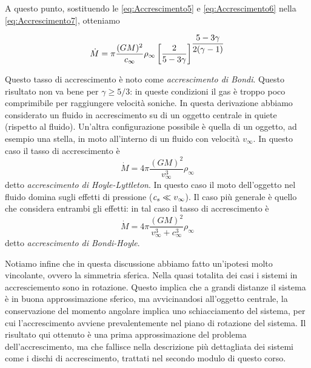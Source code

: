 A questo punto, sostituendo le \ref{eq:Accrescimento5} e \ref{eq:Accrescimento6} nella \ref{eq:Accrescimento7}, otteniamo
\begin{EQ}
\begin{equation}
\dot{M} = \pi \dfrac{(GM)^2}{c_\infty} \rho_\infty\left[ \dfrac{2}{5-3\gamma} \right]^{\dfrac{5-3\gamma}{2(\gamma-1)}}
\end{equation}
\end{EQ}
Questo tasso di accrescimento è noto come \textit{accrescimento di Bondi}.
Questo risultato non va bene per $\gamma\geq 5/3$: in queste condizioni il gas è troppo poco comprimibile per raggiungere velocità soniche. In questa derivazione abbiamo considerato un fluido in accrescimento su di un oggetto centrale in quiete (rispetto al fluido). Un'altra configurazione possibile è quella di un oggetto, ad esempio una stella, in moto all'interno di un fluido con velocità $v_\infty$. In questo caso il tasso di accrescimento è
\begin{equation}
\dot{M} = 4\pi \dfrac{(GM)^2}{v_\infty^3}\rho_\infty
\end{equation}
detto \textit{accrescimento di Hoyle-Lyttleton}. In questo caso il moto dell'oggetto nel fluido domina sugli effetti di pressione ($\textit{c}_{s}\ll v_\infty$). Il caso più generale è quello che considera entrambi gli effetti: in tal caso il tasso di accrescimento è
\begin{equation}
\dot{M} = 4\pi \dfrac{(GM)^2}{v_\infty^3 + c_\infty^3}\rho_\infty
\end{equation}
detto \textit{accrescimento di Bondi-Hoyle}.

Notiamo infine che in questa discussione abbiamo fatto un'ipotesi molto vincolante, ovvero la simmetria sferica. Nella quasi totalita dei casi i sistemi in accresciemento sono in rotazione. Questo implica che a grandi distanze il sistema è in buona approssimazione sferico, ma avvicinandosi all'oggetto centrale, la conservazione del momento angolare implica uno schiacciamento del sistema, per cui l'accrescimento avviene prevalentemente nel piano di rotazione del sistema. Il risultato qui ottenuto è una prima approssimazione del problema dell'accrescimento, ma che fallisce nella descrizione più dettagliata dei sistemi come i dischi di accrescimento, trattati nel secondo modulo di questo corso.


